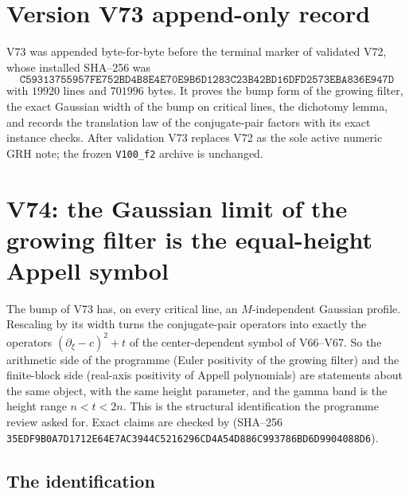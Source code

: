 \documentclass[11pt]{article}
\theoremstyle{definition}
\theoremstyle{remark}
\begin{document}
\section*{Version V73 append-only record}

V73 was appended byte-for-byte before the terminal marker of validated
V72, whose installed SHA--256 was
\[
 \texttt{C59313755957FE752BD4B8E4E70E9B6D}
 \allowbreak\texttt{1283C23B42BD16DFD2573EBA836E947D}
\]
with \(19920\) lines and \(701996\) bytes.  It proves the bump form of
the growing filter, the exact Gaussian width of the bump on critical
lines, the dichotomy lemma, and records the translation law of the
conjugate-pair factors with its exact instance checks.  After validation
V73 replaces V72 as the sole active numeric GRH note; the frozen
\texttt{V100\_f2} archive is unchanged.





\clearpage
\section{V74: the Gaussian limit of the growing filter is the equal-height Appell symbol}
\label{sec:f2v74-limit}
\begingroup
\setcounter{equation}{0}
\renewcommand{\theequation}{N74.\arabic{equation}}
\renewcommand{\theHequation}{f2v74.\arabic{equation}}

The bump of V73 has, on every critical line, an \(M\)-independent Gaussian
profile.  Rescaling by its width turns the conjugate-pair operators into
exactly the operators \((\partial_\xi-c)^2+t\) of the center-dependent
symbol of V66--V67.  So the arithmetic side of the programme (Euler
positivity of the growing filter) and the finite-block side (real-axis
positivity of Appell polynomials) are statements about the same object,
with the same height parameter, and the gamma band is the height range
\(n<t<2n\).  This is the structural identification the programme review
asked for.  Exact claims are checked by
 (SHA--256
\texttt{35EDF9B0A7D1712E64E7AC3944C52162}\allowbreak\texttt{96CD4A54D886C993786BD6D9904088D6}).

\subsection{The identification}
\end{document}
